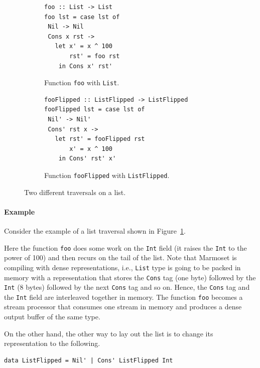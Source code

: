 \documentclass[acmsmall,review,anonymous]{acmart}\settopmatter{printfolios=true,printccs=false,printacmref=false}
\newcommand{\ie}{{i.e.,}}
\newcommand{\system}{{\sc Marmoset}\xspace}
\begin{document}
\begin{figure}
\centering
\begin{subfigure}{.5\textwidth}
\begin{lstlisting}
foo :: List -> List 
foo lst = case lst of 
 Nil -> Nil
 Cons x rst -> 
   let x' = x ^ 100 
       rst' = foo rst 
    in Cons x' rst'
\end{lstlisting}
\caption{Function \lstinline|foo| with \lstinline|List|.}
\label{fig:foo}
\end{subfigure}\begin{subfigure}{.5\textwidth}
\centering
\begin{lstlisting}
fooFlipped :: ListFlipped -> ListFlipped 
fooFlipped lst = case lst of
 Nil' -> Nil'
 Cons' rst x -> 
   let rst' = fooFlipped rst
       x' = x ^ 100
    in Cons' rst' x' 
\end{lstlisting}
\caption{Function \lstinline|fooFlipped| with \lstinline|ListFlipped|.}
\label{fig:fooFlipped}
\end{subfigure}
\caption{Two different traversals on a list.}
\label{fig:two-diff-traversals}
\end{figure}

\paragraph{Example}
Consider the example of a list traversal shown in Figure~\ref{fig:foo}.


Here the function \lstinline|foo| does some work on the \lstinline|Int| field (it raises the \lstinline|Int| to the power of 100) and then recurs on the tail of the list.
Note that \system is compiling with dense representations, \ie{}
\lstinline|List| type is going to be 
packed in memory with a representation that stores the \lstinline|Cons| tag (one byte) followed by the \lstinline|Int| (8 bytes) followed by 
the next \lstinline|Cons| tag and so on. Hence, the \lstinline|Cons| tag and the \lstinline|Int| field are interleaved together in memory.
The function \lstinline|foo| becomes a stream processor that consumes one stream in memory and produces a dense output buffer of the same type.

On the other hand, the other way to lay out the list is to change its representation to the following. 
\begin{lstlisting}
data ListFlipped = Nil' | Cons' ListFlipped Int
\end{lstlisting}
\end{document}
